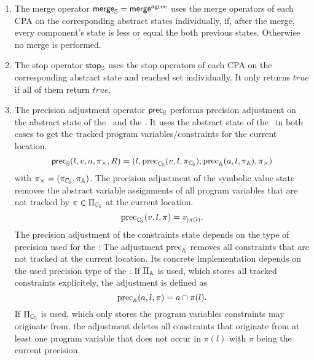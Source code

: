 \begin{enumerate}[leftmargin=*, label=\arabic*.]
\item
The merge operator
	$\operatorname{\operatorname{\mathsf{merge}}}_{\mathbb{S}} = \operatorname{{\operatorname{\operatorname{\mathsf{merge}}}^{agree}}}$ uses the merge operators of each CPA on the corresponding abstract states individually, if, after the merge, every component's state is less or equal the both previous states. Otherwise no merge is performed.

\item
The stop operator $\operatorname{\operatorname{\mathsf{stop}}}_{\mathbb{S}}$
	uses the stop operators of each CPA on the corresponding abstract state and reached set individually. It only returns $true$ if all of them return $true$.

\item
The precision adjustment operator $\operatorname{\operatorname{\mathsf{prec}}}_{\mathbb{S}}$ performs precision adjustment on the abstract state of the \symbolicValueAnalysisCPA\ and the \constraintsCPA.
It uses the abstract state of the \locationCPA\ in both cases to get the tracked program variables/constraints for the current location.
\[ \operatorname{\operatorname{\mathsf{prec}}}_{\mathbb{S}}(l, v, a, \pi_\times, R) = (l, \operatorname{\text{prec}}_{\mathbb{C_{S}}}(v, l, \pi_{\mathbb{C_{S}}}), \operatorname{\text{prec}}_{\mathbb{A}}(a, l, \pi_{\mathbb{A}}), \pi_\times) \]
with $\pi_\times = (\pi_{\mathbb{C_{S}}}, \pi_{\mathbb{A}})$.
The precision adjustment of the symbolic value state removes the abstract variable assignments of all program variables that are not tracked by $\pi \in \Pi_{\mathbb{C_{S}}}$ at the current location.
\[\operatorname{\text{prec}}_{\mathbb{C_{S}}}(v, l, \pi) = v_{|\pi(l)}.\]
The precision adjustment of the constraints state depends on the type of precision used for the \constraintsCPA:
The adjustment $\operatorname{\text{prec}}_{\mathbb{A}}$  removes all constraints that are not tracked at the current location.
Its concrete implementation depends on the used precision type of the \constraintsCPA:
If $\Pi_{\mathbb{A}}$ is used, which stores all tracked constraints explicitely, the adjustment is defined as
\[\operatorname{\text{prec}}_{\mathbb{A}}(a, l, \pi)= a \cap \pi(l).\]
If $\Pi_{\mathbb{C_{S}}}$ is used, which only stores the program variables constraints may originate from, the adjustment deletes all constraints that originate from at least one program variable that does not occur in $\pi(l)$ with $\pi$ being the current precision.
\end{enumerate}
